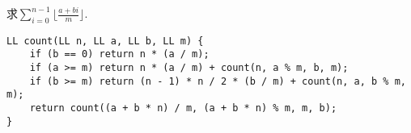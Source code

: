 求$\displaystyle\sum_{i=0}^{n-1} \lfloor\frac{a+bi}{m}\rfloor$.
	\begin{lstlisting}
LL count(LL n, LL a, LL b, LL m) {
	if (b == 0) return n * (a / m);
	if (a >= m) return n * (a / m) + count(n, a % m, b, m);
	if (b >= m) return (n - 1) * n / 2 * (b / m) + count(n, a, b % m, m);
	return count((a + b * n) / m, (a + b * n) % m, m, b);
}
	\end{lstlisting}
